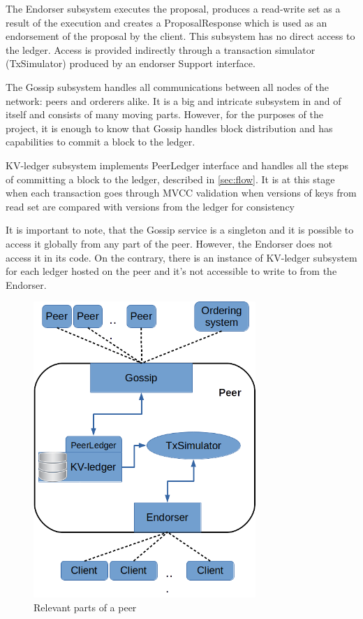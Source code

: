 The Endorser subsystem executes the proposal, produces a read-write set as a result of the execution and creates a ProposalResponse which is used as an endorsement of the proposal by the client. This subsystem has no direct access to the ledger. Access is provided indirectly through a transaction simulator (TxSimulator) produced by an endorser Support interface.

The Gossip subsystem handles all communications between all nodes of the network: peers and orderers alike. It is a big and intricate subsystem in and of itself and consists of many moving parts. However, for the purposes of the project, it is enough to know that Gossip handles block distribution and has capabilities to commit a block to the ledger.

KV-ledger subsystem implements PeerLedger interface and handles all the steps of committing a block to the ledger, described in \ref{sec:flow}. It is at this stage when each transaction goes through MVCC validation when versions of keys from read set are compared with versions from the ledger for consistency

It is important to note, that the Gossip service is a singleton and it is possible to access it globally from any part of the peer. However, the Endorser does not access it in its code. On the contrary, there is an instance of KV-ledger subsystem for each ledger hosted on the peer and it's not accessible to write to from the Endorser.

\vspace{0.5cm}
\begin{figure}[H]
\begin{center}
\includegraphics[width=0.75\textwidth]{figures/peer}
\end{center}
\caption{Relevant parts of a peer}
\label{fig:peer}
\end{figure}
